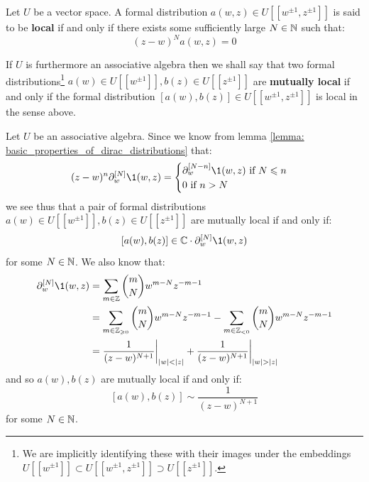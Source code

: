         \begin{definition}[Locality] \label{def: locality}
            Let $U$ be a vector space. A formal distribution $a(w, z) \in U[\![w^{\pm 1}, z^{\pm 1}]\!]$ is said to be \textbf{local} if and only if there exists some sufficiently large $N \in \mathbb{N}$ such that:
                $$(z - w)^N a(w, z) = 0$$
                
            If $U$ is furthermore an associative algebra then we shall say that two formal distributions\footnote{We are implicitly identifying these with their images under the embeddings $U[\![w^{\pm 1}]\!] \subset U[\![w^{\pm 1}, z^{\pm 1}]\!] \supset U[\![z^{\pm 1}]\!]$.} $a(w) \in U[\![w^{\pm 1}]\!], b(z) \in U[\![z^{\pm 1}]\!]$ are \textbf{mutually local} if and only if the formal distribution $[a(w), b(z)] \in U[\![w^{\pm 1}, z^{\pm 1}]\!]$ is local in the sense above.
        \end{definition}
        \begin{remark}
            Let $U$ be an associative algebra. Since we know from lemma \ref{lemma: basic_properties_of_dirac_distributions} that:
                $$
                    (z - w)^n \del_w^{[N]} \1(w, z) =
                    \begin{cases}
                        \text{$\del_w^{[N - n]} \1(w, z)$ if $N \leq n$}
                        \\
                        \text{$0$ if $n > N$}
                    \end{cases}
                $$
            we see thus that a pair of formal distributions $a(w) \in U[\![w^{\pm 1}]\!], b(z) \in U[\![z^{\pm 1}]\!]$ are mutually local if and only if:
                $$[a(w), b(z)] \in \bbC \cdot \del_w^{[N]} \1(w, z)$$
            for some $N \in \mathbb{N}$. We also know that:
                $$
                    \begin{aligned}
                        \del_w^{[N]} \1(w, z) & = \sum_{m \in \Z} \binom{m}{N} w^{m - N} z^{-m - 1}
                        \\
                        & = \sum_{m \in \Z_{\geq 0}} \binom{m}{N} w^{m - N} z^{-m - 1} - \sum_{m \in \Z_{< 0}} \binom{m}{N} w^{m - N} z^{-m - 1}
                        \\
                        & = \frac{1}{(z - w)^{N + 1}}\bigg|_{|w| < |z|} + \frac{1}{(z - w)^{N + 1}}\bigg|_{|w| > |z|}
                    \end{aligned}
                $$
            and so $a(w), b(z)$ are mutually local if and only if:
                $$[a(w), b(z)] \sim \frac{1}{(z - w)^{N + 1}}$$
            for some $N \in \mathbb{N}$.
        \end{remark}

        